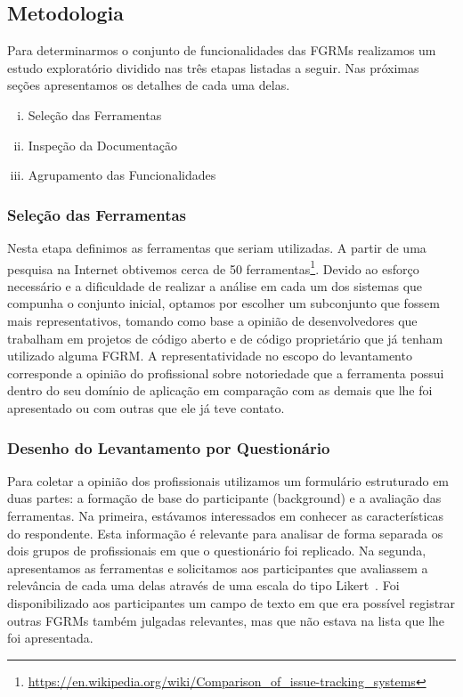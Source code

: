 \subsection{Metodologia}
\label{subsec:metodologia}

Para determinarmos o conjunto de funcionalidades das FGRMs realizamos um estudo
exploratório dividido nas três etapas listadas a seguir. Nas próximas seções
apresentamos os detalhes de cada uma delas.

\begin{enumerate}[(i)]
	\item Seleção das Ferramentas
	\item Inspeção da Documentação
	\item Agrupamento das Funcionalidades
\end{enumerate}

\subsubsection{Seleção das Ferramentas}
\label{subsubsec:selecao-ferramentas}

Nesta etapa definimos as ferramentas que seriam utilizadas. A partir de uma
pesquisa na Internet obtivemos cerca de 50
ferramentas\footnote{\url{https://en.wikipedia.org/wiki/Comparison_of_issue-tracking_systems}}.
Devido ao esforço necessário e a dificuldade de realizar a análise em cada um
dos sistemas que compunha o conjunto inicial, optamos por escolher um
subconjunto que fossem mais representativos, tomando como base a opinião de
desenvolvedores que trabalham em projetos de código aberto e de código
proprietário que já tenham utilizado alguma FGRM\@. A representatividade no
escopo do levantamento corresponde a opinião do profissional sobre notoriedade
que a ferramenta possui dentro do seu domínio de aplicação em comparação com as
demais que lhe foi apresentado ou com outras que ele já teve contato.

\subsubsection{Desenho do Levantamento por Questionário}
\label{ssub:metodologia_desenho_da_pesquisa_com_profissionais}

Para coletar a opinião dos profissionais utilizamos um formulário estruturado em
duas partes: a formação de base do participante (background) e a avaliação das
ferramentas. Na primeira, estávamos interessados em conhecer as características
do respondente. Esta informação é relevante para analisar de forma separada os
dois grupos de profissionais em que o questionário foi replicado. Na segunda,
apresentamos as ferramentas e solicitamos aos participantes que avaliassem a
relevância de cada uma delas através de uma escala do tipo
Likert~\cite{robbins2011plotting}. Foi disponibilizado aos participantes um
campo de texto em que era possível registrar outras FGRMs também julgadas
relevantes, mas que não estava na lista que lhe foi apresentada.

